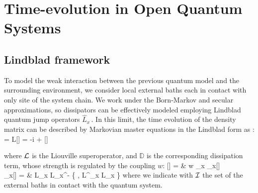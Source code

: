 \section{Time-evolution in Open Quantum Systems}


\subsection{Lindblad framework}

To model the weak interaction between the previous quantum model and the surrounding
environment, we consider local external baths each in contact with only site of the system
chain. We work under the Born-Markov and secular approximations, so dissipators 
can be effectively modeled employing Lindblad quantum jump operators $\hat L_x\,$. 
In this limit, the time evolution of the density matrix can be described by Markovian
master equations in the Lindblad form as \cite{BP-openquantumsystembook, TV-21}:
	 = {\cal L}[\rho] = 
		-i  +  \pc
\ea

where ${\cal L}$ is the Liouville superoperator, and $\mathbb{D}$ is the corresponding 
dissipation term, whose strength is regulated by the coupling $w$:
	[\rho] = & w \sum_{x } 
		_x[\rho] \cm \\
	_x[\rho] = &
		\hat L_x \rho \hat L_x^\dagger - 
		 \Bigl\{ \rho, \hat L^\dagger_x \hat L_x \Bigl\} \pc
\ea
where we indicate with ${\cal I}$ the set of the external baths in contact with the
quantum system.

